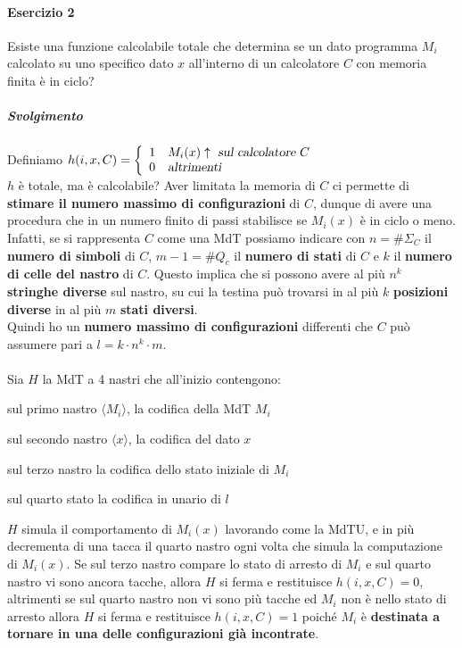 \documentclass[10pt]{book}
\begin{document}
\paragraph{Esercizio 2} Esiste una funzione calcolabile totale che determina se un dato programma $M_i$ calcolato su uno specifico dato $x$ all'interno di un calcolatore $C$ con memoria finita è in ciclo?
\subparagraph{Svolgimento} Definiamo $h(i,x,C) = \left\{\begin{array}{l l}
	1&M_i(x)\uparrow\textsl{ sul calcolatore }C\\
	0&\textsl{altrimenti}
\end{array}\right.$\\
$h$ è totale, ma è calcolabile? Aver limitata la memoria di $C$ ci permette di \textbf{stimare il numero massimo di configurazioni} di $C$, dunque di avere una procedura che in un numero finito di passi stabilisce se $M_i(x)$ è in ciclo o meno.\\
Infatti, se si rappresenta $C$ come una MdT possiamo indicare con $n = \#\Sigma_C$ il \textbf{numero di simboli} di $C$, $m-1 = \#Q_c$ il \textbf{numero di stati} di $C$ e $k$ il \textbf{numero di celle del nastro} di $C$. Questo implica che si possono avere al più $n^k$ \textbf{stringhe diverse} sul nastro, su cui la testina può trovarsi in al più $k$ \textbf{posizioni diverse} in al più $m$ \textbf{stati diversi}.\\
Quindi ho un \textbf{numero massimo di configurazioni} differenti che $C$ può assumere pari a $l = k\cdot n^k\cdot m$.\\\\
Sia $H$ la MdT a 4 nastri che all'inizio contengono:
\begin{list}{}{}
	\item sul primo nastro $\langle M_i\rangle$, la codifica della MdT $M_i$
	\item sul secondo nastro $\langle x\rangle$, la codifica del dato $x$
	\item sul terzo nastro la codifica dello stato iniziale di $M_i$
	\item sul quarto stato la codifica in unario di $l$
\end{list}
$H$ simula il comportamento di $M_i(x)$ lavorando come la MdTU, e in più decrementa di una tacca il quarto nastro ogni volta che simula la computazione di $M_i(x)$. Se sul terzo nastro compare lo stato di arresto di $M_i$ e sul quarto nastro vi sono ancora tacche, allora $H$ si ferma e restituisce $h(i, x, C) = 0$, altrimenti se sul quarto nastro non vi sono più tacche ed $M_i$ non è nello stato di arresto allora $H$ si ferma e restituisce $h(i,x,C) = 1$ poiché $M_i$ è \textbf{destinata a tornare in una delle configurazioni già incontrate}.\\\\
\end{document}
